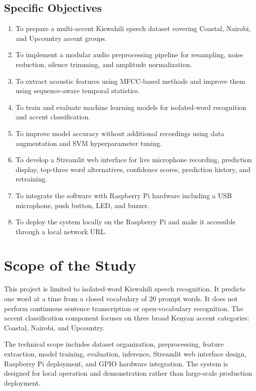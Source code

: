 \documentclass[12pt,a4paper]{report}
\begin{document}
\subsection{Specific Objectives}
\begin{enumerate}[label=\alph*)]
    \item To prepare a multi-accent Kiswahili speech dataset covering Coastal, Nairobi, and Upcountry accent groups.
    \item To implement a modular audio preprocessing pipeline for resampling, noise reduction, silence trimming, and amplitude normalization.
    \item To extract acoustic features using MFCC-based methods and improve them using sequence-aware temporal statistics.
    \item To train and evaluate machine learning models for isolated-word recognition and accent classification.
    \item To improve model accuracy without additional recordings using data augmentation and SVM hyperparameter tuning.
    \item To develop a Streamlit web interface for live microphone recording, prediction display, top-three word alternatives, confidence scores, prediction history, and retraining.
    \item To integrate the software with Raspberry Pi hardware including a USB microphone, push button, LED, and buzzer.
    \item To deploy the system locally on the Raspberry Pi and make it accessible through a local network URL.
\end{enumerate}

\section{Scope of the Study}
This project is limited to isolated-word Kiswahili speech recognition. It predicts one word at a time from a closed vocabulary of 20 prompt words. It does not perform continuous sentence transcription or open-vocabulary recognition. The accent classification component focuses on three broad Kenyan accent categories: Coastal, Nairobi, and Upcountry.

The technical scope includes dataset organization, preprocessing, feature extraction, model training, evaluation, inference, Streamlit web interface design, Raspberry Pi deployment, and GPIO hardware integration. The system is designed for local operation and demonstration rather than large-scale production deployment.
\end{document}
